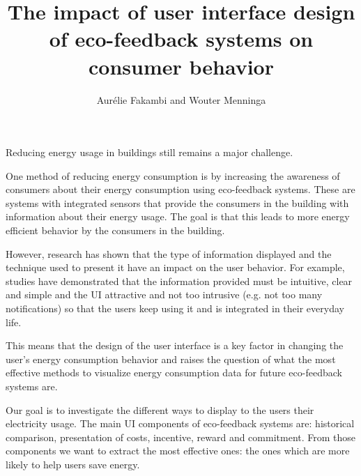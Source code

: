 \documentclass[journal]{vgtc}                %
\title{The impact of user interface design of eco-feedback systems on consumer behavior}
\author{Aur\'{e}lie Fakambi and Wouter Menninga}
\begin{document}


\maketitle


Reducing energy usage in buildings still remains a major challenge.

One method of reducing energy consumption is by increasing the awareness of consumers about their energy consumption using eco-feedback systems. These are systems with integrated sensors that provide the consumers in the building with information about their energy usage. The goal is that this leads to more energy efficient behavior by the consumers in the building. 

However, research has shown that the type of information displayed and the technique used to present it have an impact on the user behavior.
For example, studies have demonstrated that the information provided must be intuitive, clear and simple and the UI attractive and not too intrusive (e.g. not too many notifications) so that the users keep using it and is integrated in their everyday life\cite{spagnolli2011eco}.

This means that the design of the user interface is a key factor in changing the user's energy consumption behavior and raises the question of what the most effective methods to visualize energy consumption data for future eco-feedback systems are. 

Our goal is to investigate the different ways to display to the users their electricity usage.
The main UI components of eco-feedback systems are: historical comparison, presentation of costs, incentive, reward and commitment. From those components we want to extract the most effective ones: the ones which are more likely to help users save energy. 
\end{document}

